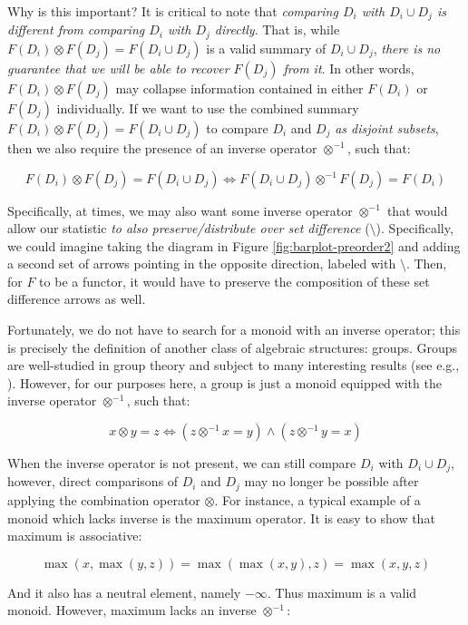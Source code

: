 \documentclass[
  openany]{book}
\theoremstyle{definition}
\theoremstyle{definition}
\theoremstyle{definition}
\theoremstyle{definition}
\theoremstyle{remark}
\begin{document}
Why is this important? It is critical to note that \emph{comparing \(D_i\) with \(D_i \cup D_j\) is different from comparing \(D_i\) with \(D_j\) directly}. That is, while \(F(D_i) \otimes F(D_j) = F(D_i \cup D_j)\) is a valid summary of \(D_i \cup D_j\), \emph{there is no guarantee that we will be able to recover \(F(D_j)\) from it}. In other words, \(F(D_i) \otimes F(D_j)\) may collapse information contained in either \(F(D_i)\) or \(F(D_j)\) individually. If we want to use the combined summary \(F(D_i) \otimes F(D_j) = F(D_i \cup D_j)\) to compare \(D_i\) and \(D_j\) \emph{as disjoint subsets}, then we also require the presence of an inverse operator \(\otimes^{-1}\), such that:

\[F(D_i) \otimes F(D_j) = F(D_i \cup D_j) \iff F(D_i \cup D_j) \otimes^{-1} F(D_j) = F(D_i)\]

Specifically, at times, we may also want some inverse operator \(\otimes^{-1}\) that would allow our statistic \emph{to also preserve/distribute over set difference} (\(\setminus\)). Specifically, we could imagine taking the diagram in Figure \ref{fig:barplot-preorder2} and adding a second set of arrows pointing in the opposite direction, labeled with \(\setminus\). Then, for \(F\) to be a functor, it would have to preserve the composition of these set difference arrows as well.

Fortunately, we do not have to search for a monoid with an inverse operator; this is precisely the definition of another class of algebraic structures: groups. Groups are well-studied in group theory and subject to many interesting results (see e.g., ). However, for our purposes here, a group is just a monoid equipped with the inverse operator \(\otimes^{-1}\), such that:

\[x \otimes y = z \iff (z \otimes^{-1} x = y) \wedge (z \otimes^{-1} y = x)\]

When the inverse operator is not present, we can still compare \(D_i\) with \(D_i \cup D_j\), however, direct comparisons of \(D_i\) and \(D_j\) may no longer be possible after applying the combination operator \(\otimes\). For instance, a typical example of a monoid which lacks inverse is the maximum operator. It is easy to show that maximum is associative:

\[\max(x, \max(y, z)) = \max(\max(x, y), z) = \max(x, y, z)\]

And it also has a neutral element, namely \(-\infty\). Thus maximum is a valid monoid. However, maximum lacks an inverse \(\otimes^{-1}\):
\end{document}
